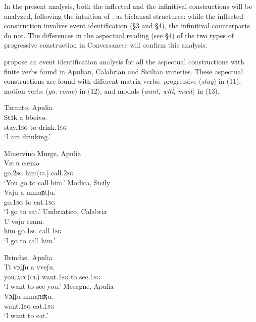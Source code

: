 \documentclass[output=paper]{langsci/langscibook}
\begin{document}
In the present analysis, both the inflected and the infinitival constructions will be analyzed, following the intuition of \citet[1:688]{Manzini2005}, as biclausal structures: while the inflected construction involves event identification (§3 and §4), the infinitival counterparts do not. The differences in the aspectual reading (see §4) of the two types of progressive construction in Conversanese will confirm this analysis.

\citet[I:688--689]{Manzini2005} propose an event identification analysis for all the aspectual constructions with finite verbs found in Apulian, Calabrian and Sicilian varieties. These aspectual constructions are found with different matrix verbs: progressive (\textit{stay}) in (11), motion verbs (\textit{go}, \textit{come}) in (12), and modals (\textit{want}, \textit{will}, \textit{must}) in (13).

\ea%
         Taranto, Apulia\label{ex:lorusso:11}\\
    \gll Stɔk    a  bbeivə.     \\
         stay.\textsc{1sg}  to  drink.\textsc{1sg}    \\
    \glt ‘I am drinking.’
\z


\ea%
    \label{ex:lorusso:12}
    \ea  Minervino Murge, Apulia\\
    \gll Væ    u    cæmə.\\
         go.\textsc{2sg}  him(\textsc{cl})   call.\textsc{2sg}    \\
    \glt ‘You go to call him.’
    \ex  Modica, Sicily\\
    \gll Vaju    a  mmaɲtʃu.       \\
         go.\textsc{1sg} to  eat.\textsc{1sg}\\
    \glt ‘I go to eat.’     
    \ex  Umbriatico, Calabria\\
    \gll U    vəju    cəmu.\\
         him  go.\textsc{1sg}  call.\textsc{1sg}\\
    \glt ‘I go to call him.’
    \z
\z

\ea%
    \label{ex:lorusso:13}
    \ea  Brindisi, Apulia\\
    \gll Ti      vɔʄʄu    a  vveʃu.    \\
         you\textsc{.acc(cl)} want.\textsc{1sg}  to  see.\textsc{1sg}\\
    \glt ‘I want to see you.’
    \ex  Mesagne, Apulia\\
    \gll Vɔʄʄu    mmaɲʤu.          \\
         want.\textsc{1sg}   eat.\textsc{1sg}\\
    \glt ‘I want to eat.’
\z
\z
\end{document}
